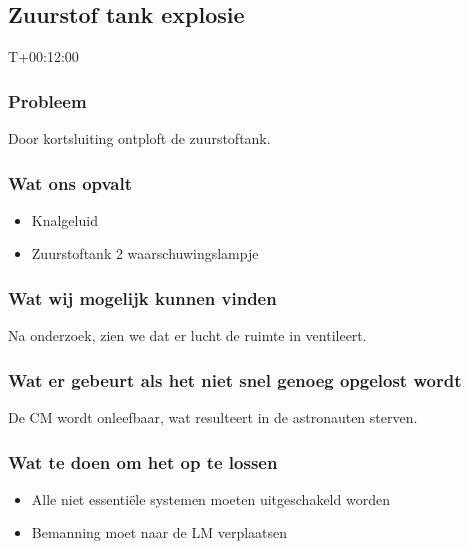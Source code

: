 \subsection{Zuurstof tank explosie}
T+00:12:00

\subsubsection{Probleem}
Door kortsluiting ontploft de zuurstoftank.

\subsubsection{Wat ons opvalt}
\begin{itemize}
    \item Knalgeluid
    \item Zuurstoftank 2 waarschuwingslampje
\end{itemize}

\subsubsection{Wat wij mogelijk kunnen vinden}
Na onderzoek, zien we dat er lucht de ruimte in ventileert.

\subsubsection{Wat er gebeurt als het niet snel genoeg opgelost wordt}
De CM wordt onleefbaar, wat resulteert in de astronauten sterven.

\subsubsection{Wat te doen om het op te lossen}
\begin{itemize}
    \item Alle niet essentiële systemen moeten uitgeschakeld worden
    \item Bemanning moet naar de LM verplaatsen
\end{itemize}